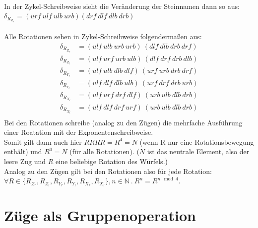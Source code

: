 \documentclass[12pt,a4paper, usenames, dvipsnames]{article}
\begin{document}
\\
In der Zykel-Schreibweise sieht die Veränderung der Steinnamen dann so aus: \\
$\delta_{R_{Z_r}}=(urf \ ulf \ ulb \ urb)(drf \ dlf \ dlb \ drb )$ \\
\\
Alle Rotationen sehen in Zykel-Schreibweise folgendermaßen aus:
\begin{align*}
\delta_{R_{Z_r}} & = (ulf \ ulb \ urb \ urb) \ (dlf \ dlb \ drb \ drf)\\
\delta_{R_{Z_l}} & = (ulf \ urf \ urb \ ulb) \ (dlf \ drf \ drb \ dlb)\\
\delta_{R_{Y_r}} & = (ulf \ ulb \ dlb \ dlf) \ (urf \ urb \ drb \ drf)\\
\delta_{R_{Y_l}} & = (ulf \ dlf \ dlb \ ulb) \ (urf \ drf \ drb \ urb)\\
\delta_{R_{X_r}} & = (ulf \ urf \ drf \ dlf) \ (urb \ ulb \ dlb \ drb)\\
\delta_{R_{X_l}} & = (ulf \ dlf \ drf \ urf) \ (urb \ ulb \ dlb \ drb)\\
\end{align*}
Bei den Rotationen schreibe (analog zu den Zügen) die mehrfache Ausführung einer Roatation mit der Exponentenschreibweise. \\
Somit gilt dann auch hier $RRRR=R^4=N$ (wenn R nur eine Rotationsbewegung enthält) und $R^0=N$ (für alle Rotationen). ($N$ ist das neutrale Element, also der leere Zug und $R$ eine beliebige Rotation des Würfels.) \\
Analog zu den Zügen gilt bei den Rotationen also für jede Rotation: \\
 $\forall R \in \{ R_{Z_r}, R_{Z_l}, R_{Y_r}, R_{Y_l}, R_{X_r}, R_{X_l} \}, n \in \mathbb{N} \ . \ R^n=R^{n \mod 4}$.













\newpage
\section{Züge als Gruppenoperation}
\end{document}
